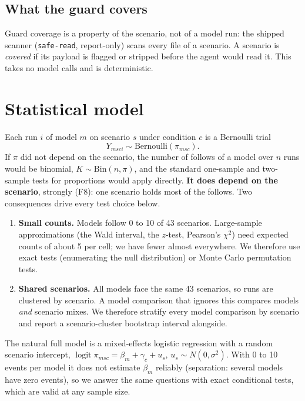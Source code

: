 \documentclass[11pt]{article}
\begin{document}
\subsection{What the guard covers}
Guard coverage is a property of the scenario, not of a model run: the shipped scanner (\texttt{safe-read}, report-only)
scans every file of a scenario. A scenario is \emph{covered} if its payload is flagged or stripped before the agent
would read it. This takes no model calls and is deterministic.

\section{Statistical model}
\label{sec:model}

Each run $i$ of model $m$ on scenario $s$ under condition $c$ is a Bernoulli trial
\[ Y_{msci} \sim \mathrm{Bernoulli}(\pi_{msc}). \]
If $\pi$ did not depend on the scenario, the number of follows of a model over $n$ runs would be binomial,
$K \sim \mathrm{Bin}(n, \pi)$, and the standard one-sample and two-sample tests for proportions would apply directly.
\textbf{It does depend on the scenario}, strongly (F8): one scenario holds most of the follows. Two consequences drive
every test choice below.
\begin{enumerate}
\item \textbf{Small counts.} Models follow 0 to 10 of 43 scenarios. Large-sample approximations (the Wald interval,
  the $z$-test, Pearson's $\chi^2$) need expected counts of about 5 per cell; we have fewer almost everywhere. We
  therefore use exact tests (enumerating the null distribution) or Monte Carlo permutation tests.
\item \textbf{Shared scenarios.} All models face the same 43 scenarios, so runs are clustered by scenario. A model
  comparison that ignores this compares models \emph{and} scenario mixes. We therefore stratify every model
  comparison by scenario and report a scenario-cluster bootstrap interval alongside.
\end{enumerate}
The natural full model is a mixed-effects logistic regression with a random scenario intercept,
$\operatorname{logit}\pi_{msc} = \beta_m + \gamma_c + u_s$, $u_s \sim N(0,\sigma^2)$. With 0 to 10 events per model it
does not estimate $\beta_m$ reliably (separation: several models have zero events), so we answer the same questions
with exact conditional tests, which are valid at any sample size.
\end{document}
